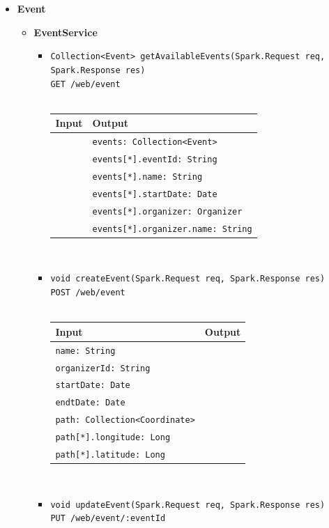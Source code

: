 \documentclass[a4paper, hidelinks, 12pt]{report}
\begin{document}
\begin{itemize}
		\item{\textbf{Event}}
			\begin{itemize}
				\item{\textbf{EventService}}
					\begin{itemize}
						\item{\verb|Collection<Event> getAvailableEvents(Spark.Request req, Spark.Response res)|\\ \verb|GET /web/event|}\\\\
			\begin{tabular}{l | l}
			\textbf{Input} & \textbf{Output} \\
			\hline
				& \verb|events: Collection<Event>| \\
				& \verb|events[*].eventId: String| \\
				& \verb|events[*].name: String| \\
				& \verb|events[*].startDate: Date| \\
				& \verb|events[*].organizer: Organizer| \\
				& \verb|events[*].organizer.name: String| \\
			\end{tabular}\\
			\item{\verb|void createEvent(Spark.Request req, Spark.Response res)|\\ \verb|POST /web/event|}\\\\
			\begin{tabular}{l | l}
			\textbf{Input} & \textbf{Output} \\
			\hline
				\verb|name: String| & \\
				\verb|organizerId: String| & \\
				\verb|startDate: Date| & \\
				\verb|endtDate: Date| & \\
				\verb|path: Collection<Coordinate>| & \\
				\verb|path[*].longitude: Long| & \\
				\verb|path[*].latitude: Long| & \\
			\end{tabular}\\
			\item{\verb|void updateEvent(Spark.Request req, Spark.Response res)|\\ \verb|PUT /web/event/:eventId|}\\\\

\end{itemize}
\end{itemize}
\end{itemize}
\end{document}
